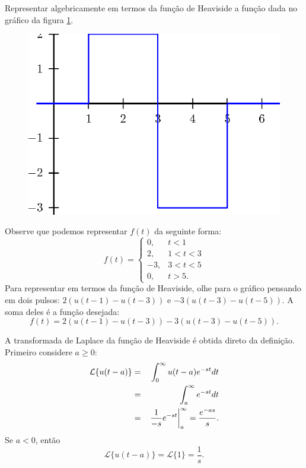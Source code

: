 \begin{ex} Representar algebricamente em termos da função de Heaviside a função dada no gráfico da figura \ref{fig_Heaviside_4}.
\begin{figure}[!ht]
\begin{center}

\includegraphics{cap_trans_int/pics/figura_8}\end{center}
\caption{\label{fig_Heaviside_4}}
\end{figure}
Observe que podemos representar $f(t)$ da seguinte forma:
\begin{equation}
 f(t)=\left\{ \begin{array}{ll} 0, &t<1\\2,&1<t<3\\-3,& 3<t<5\\0,&t>5. \end{array}\right.
\end{equation}
Para representar em termos da função de Heaviside, olhe para o gráfico pensando em dois pulsos: $2(u(t-1)-u(t-3))$ e $-3(u(t-3)-u(t-5))$. A soma deles é a função desejada:
\begin{equation}
f(t)=2(u(t-1)-u(t-3))-3(u(t-3)-u(t-5)).
\end{equation}
\end{ex}

A transformada de Laplace da função de Heaviside é obtida direto da definição. Primeiro considere $a\geq 0$:
\begin{eqnarray}
\nonumber \mathcal{L}\{u(t-a)\}&=&\int_0^\infty u(t-a) e^{-st}dt\\
\nonumber &=&\int_a^\infty  e^{-st}dt\\
 &=&\left.  \frac{1}{-s}e^{-st}\right|_a^\infty=\frac{e^{-as}}{s}. {\label{Heaviside_trans}}
\end{eqnarray}
Se $a<0$, então
\begin{equation}
 \mathcal{L}\{u(t-a)\}=\mathcal{L}\{1\}=\frac{1}{s}.
\end{equation}

